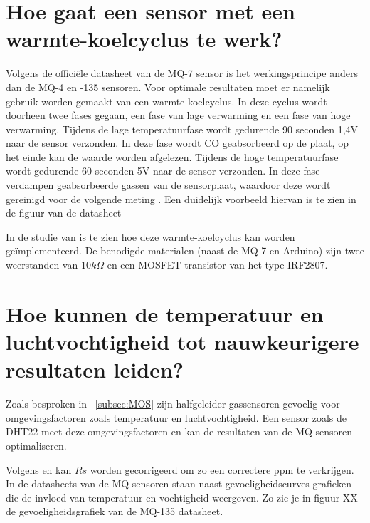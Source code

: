 \section{Hoe gaat een sensor met een warmte-koelcyclus te werk?}%
\label{sec:warmte-koelcyclus}


Volgens de officiële datasheet van de MQ-7 sensor is het werkingsprincipe anders dan de MQ-4 en -135 sensoren. Voor optimale resultaten moet er namelijk gebruik worden gemaakt van een warmte-koelcyclus. In deze cyclus wordt doorheen twee fases gegaan, een fase van lage verwarming en een fase van hoge verwarming. Tijdens de lage temperatuurfase wordt gedurende 90 seconden 1,4V naar de sensor verzonden. In deze fase wordt CO geabsorbeerd op de plaat, op het einde kan de waarde worden afgelezen. Tijdens de hoge temperatuurfase wordt gedurende 60 seconden 5V naar de sensor verzonden. In deze fase verdampen geabsorbeerde gassen van de sensorplaat, waardoor deze wordt gereinigd voor de volgende meting
. Een duidelijk voorbeeld hiervan is te zien in de figuur van de datasheet

In de studie van 
is te zien hoe deze warmte-koelcyclus kan worden geïmplementeerd. De benodigde materialen (naast de MQ-7 en Arduino) zijn twee weerstanden van 10$k\Omega$ en een MOSFET transistor van het type IRF2807.


\section{Hoe kunnen de temperatuur en luchtvochtigheid tot nauwkeurigere resultaten leiden?}
\label{sec:temp-en-hum}

Zoals besproken in ~\ref{subsec:MOS} zijn halfgeleider gassensoren gevoelig voor omgevingsfactoren zoals temperatuur en luchtvochtigheid. Een sensor zoals de DHT22
meet deze omgevingsfactoren en kan de resultaten van de MQ-sensoren optimaliseren.

Volgens
en
kan $Rs$ worden gecorrigeerd om zo een correctere ppm te verkrijgen. In de datasheets van de MQ-sensoren staan naast gevoeligheidscurves grafieken die de invloed van temperatuur en vochtigheid weergeven. Zo zie je in figuur XX de gevoeligheidsgrafiek van de MQ-135 datasheet.




